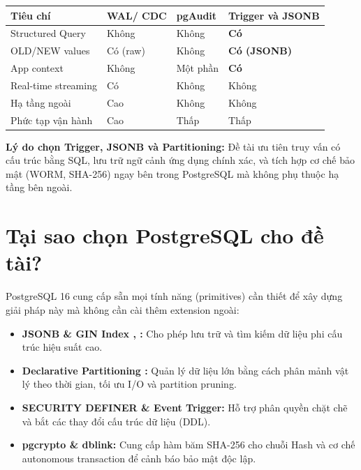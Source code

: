 \begin{center}
\label{tab:solution-comparison}
\setlength{\tabcolsep}{4pt}
\footnotesize
\begin{tabularx}{\textwidth}{>{\raggedright\arraybackslash}p{3.5cm}>{\centering\arraybackslash}X>{\centering\arraybackslash}X>{\centering\arraybackslash}X}
\toprule
\textbf{Tiêu chí} & \textbf{WAL/ CDC} & \textbf{pgAudit} & \textbf{Trigger và JSONB} \\
\midrule
Structured Query & Không & Không & \textbf{Có} \\
OLD/NEW values & Có (raw) & Không & \textbf{Có (JSONB)} \\
App context & Không & Một phần & \textbf{Có} \\
Real-time streaming & Có & Không & Không \\
Hạ tầng ngoài & Cao & Không & Không \\
Phức tạp vận hành & Cao & Thấp & Thấp \\
\bottomrule
\end{tabularx}
\end{center}

\textbf{Lý do chọn Trigger, JSONB và Partitioning:} Đề tài ưu tiên truy vấn có cấu trúc bằng SQL, lưu trữ ngữ cảnh ứng dụng chính xác, và tích hợp cơ chế bảo mật (WORM, SHA-256) ngay bên trong PostgreSQL mà không phụ thuộc hạ tầng bên ngoài.

\section{Tại sao chọn PostgreSQL cho đề tài?}

PostgreSQL 16 cung cấp sẵn mọi tính năng (primitives) cần thiết để xây dựng giải pháp này mà không cần cài thêm extension ngoài:

\begin{sloppypar}
\begin{itemize}
    \item \textbf{JSONB \& GIN Index \cite{PG16JSONB}, \cite{PG16GIN}:} Cho phép lưu trữ và tìm kiếm dữ liệu phi cấu trúc hiệu suất cao.
    \item \textbf{Declarative Partitioning \cite{PG16Partitioning}:} Quản lý dữ liệu lớn bằng cách phân mảnh vật lý theo thời gian, tối ưu I/O và partition pruning.
    \item \textbf{SECURITY DEFINER \& Event Trigger:} Hỗ trợ phân quyền chặt chẽ và bắt các thay đổi cấu trúc dữ liệu (DDL).
    \item \textbf{pgcrypto \& dblink:} Cung cấp hàm băm SHA-256 cho chuỗi Hash và cơ chế autonomous transaction để cảnh báo bảo mật độc lập.
\end{itemize}
\end{sloppypar}
